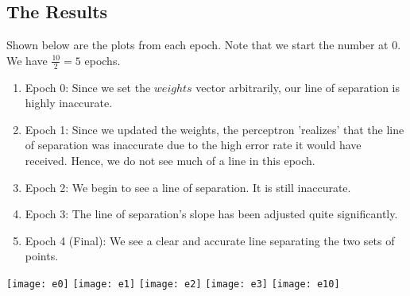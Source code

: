 \subsection{The Results}
Shown below are the plots from each epoch. Note that we start the number at $0$. We have $\frac{10}{2} = 5$ epochs.

	\begin{enumerate}
		\item Epoch 0: Since we set the $weights$ vector arbitrarily, our line of separation is highly inaccurate.
		
		\item Epoch 1: Since we updated the weights, the perceptron 'realizes' that the line of separation was inaccurate due to the high error rate it would have received. Hence, we do not see much of a line in this epoch.
		
		\item Epoch 2: We begin to see a line of separation. It is still inaccurate.
		
		\item Epoch 3: The line of separation's slope has been adjusted quite significantly. 
		
		\item Epoch 4 (Final): We see a clear and accurate line separating the two sets of points. 
	\end{enumerate}

\begin{center}
	\texttt{[image: e0]}
	\texttt{[image: e1]}
	\texttt{[image: e2]}
	\texttt{[image: e3]}
	\texttt{[image: e10]}
\end{center}